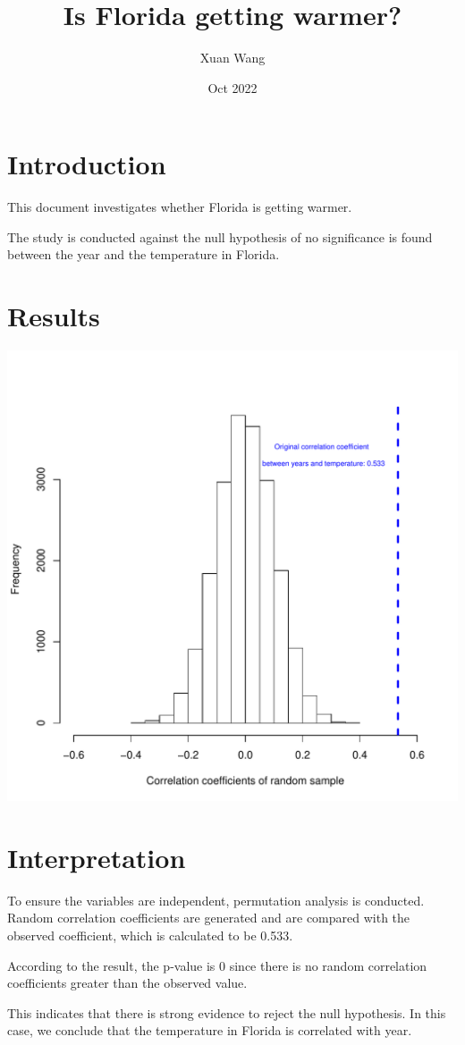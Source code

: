 \documentclass[11pt, oneside]{article}
\title{Is Florida getting warmer?}
\author{Xuan Wang}
\date{Oct 2022}
\begin{document}
\maketitle

\section{Introduction}

This document investigates whether Florida is getting warmer. 

The study is conducted against the null hypothesis of no significance is found between the year and the temperature in Florida.

\section{Results}

\includegraphics[scale = 0.5]{../results/Floridaplot.pdf}

\section{Interpretation}
To ensure the variables are independent, permutation analysis is conducted. Random correlation coefficients are generated and are compared with the observed coefficient, which is calculated to be 0.533.

According to the result, the p-value is 0 since there is no random correlation coefficients greater than the observed value.

This indicates that there is strong evidence to reject the null hypothesis. In this case, we conclude that the temperature in Florida is correlated with year.
\end{document}

